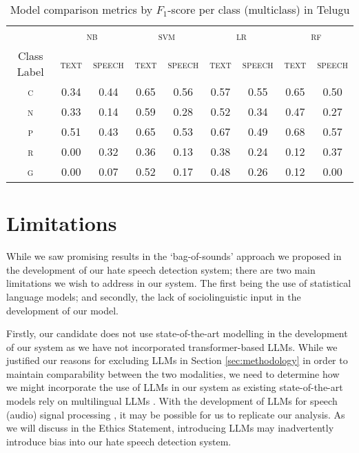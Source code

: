 \documentclass[11pt]{article}
\begin{document}
     \begin{table*}[]
        \caption{\label{tab:multiclass_telugu} Model comparison metrics by $F_1$-score per class (multiclass) in Telugu}
        \centering
        \begin{tabular}{ccccccccc}
            \hline
            \multicolumn{1}{c}{} & \multicolumn{2}{c}{\textsc{nb}} & \multicolumn{2}{c}{\textsc{svm}} & \multicolumn{2}{c}{\textsc{lr}} & \multicolumn{2}{c}{\textsc{rf}} \\
            Class Label & \textsc{text} & \textsc{speech} & \textsc{text} & \textsc{speech} & \textsc{text} & \textsc{speech} & \textsc{text} & \textsc{speech}  \\
            \hline
            \textsc{c} & 0.34 & 0.44 & 0.65 & 0.56 & 0.57 & 0.55 & 0.65 & 0.50 \\
            \textsc{n} & 0.33 & 0.14 & 0.59 & 0.28 & 0.52 & 0.34 & 0.47 & 0.27 \\
            \textsc{p} & 0.51 & 0.43 & 0.65 & 0.53 & 0.67 & 0.49 & 0.68 & 0.57 \\
            \textsc{r} & 0.00 & 0.32 & 0.36 & 0.13 & 0.38 & 0.24 & 0.12 & 0.37 \\
            \textsc{g} & 0.00 & 0.07 & 0.52 & 0.17 & 0.48 & 0.26 & 0.12 & 0.00 \\
            \hline
         \end{tabular}
     \end{table*} 

\section{Limitations}
\label{sec:limitations}

    While we saw promising results in the `bag-of-sounds' approach we proposed in the development of our hate speech detection system; there are two main limitations we wish to address in our system. The first being the use of statistical language models; and secondly, the lack of sociolinguistic input in the development of our model. 
    
    Firstly, our candidate does not use state-of-the-art modelling in the development of our system as we have not incorporated transformer-based LLMs. While we justified our reasons for excluding LLMs in Section \ref{sec:methodology} in order to maintain comparability between the two modalities, we need to determine how we might incorporate the use of LLMs in our system as existing state-of-the-art models rely on multilingual LLMs \cite{chakravarthi_overview_2024}. With the development of LLMs for speech (audio) signal processing \cite{verma_towards_2024}, it may be possible for us to replicate our analysis. As we will discuss in the Ethics Statement, introducing LLMs may inadvertently introduce bias into our hate speech detection system.
    
\end{document}
